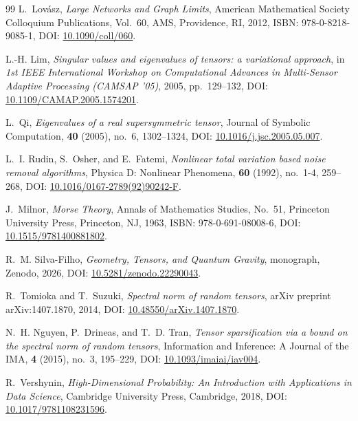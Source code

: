 \documentclass[11pt,a4paper,reqno]{amsart}
\theoremstyle{definition}
\numberwithin{equation}{section}
\begin{document}
\begin{thebibliography}{99}
L.~Lov{\'a}sz,
\emph{Large Networks and Graph Limits},
American Mathematical Society Colloquium Publications, Vol.~60, AMS, Providence, RI, 2012, ISBN: 978-0-8218-9085-1, DOI: \href{https://doi.org/10.1090/coll/060}{10.1090/coll/060}.

L.-H. Lim,
\emph{Singular values and eigenvalues of tensors: a variational approach},
in \emph{1st IEEE International Workshop on Computational Advances in Multi-Sensor Adaptive Processing (CAMSAP '05)}, 2005, pp.~129--132, DOI: \href{https://doi.org/10.1109/CAMAP.2005.1574201}{10.1109/CAMAP.2005.1574201}.

L.~Qi,
\emph{Eigenvalues of a real supersymmetric tensor},
Journal of Symbolic Computation, \textbf{40} (2005), no.~6, 1302--1324, DOI: \href{https://doi.org/10.1016/j.jsc.2005.05.007}{10.1016/j.jsc.2005.05.007}.

L.~I. Rudin, S.~Osher, and E.~Fatemi,
\emph{Nonlinear total variation based noise removal algorithms},
Physica D: Nonlinear Phenomena, \textbf{60} (1992), no.~1-4, 259--268, DOI: \href{https://doi.org/10.1016/0167-2789(92)90242-F}{10.1016/0167-2789(92)90242-F}.

J.~Milnor,
\emph{Morse Theory},
Annals of Mathematics Studies, No.~51, Princeton University Press, Princeton, NJ, 1963, ISBN: 978-0-691-08008-6, DOI: \href{https://doi.org/10.1515/9781400881802}{10.1515/9781400881802}.

R.~M. Silva-Filho,
\emph{Geometry, Tensors, and Quantum Gravity},
monograph, Zenodo, 2026, DOI: \href{https://doi.org/10.5281/zenodo.22290043}{10.5281/zenodo.22290043}.

R.~Tomioka and T.~Suzuki,
\emph{Spectral norm of random tensors},
arXiv preprint arXiv:1407.1870, 2014, DOI: \href{https://doi.org/10.48550/arXiv.1407.1870}{10.48550/arXiv.1407.1870}.

N.~H. Nguyen, P.~Drineas, and T.~D. Tran,
\emph{Tensor sparsification via a bound on the spectral norm of random tensors},
Information and Inference: A Journal of the IMA, \textbf{4} (2015), no.~3, 195--229, DOI: \href{https://doi.org/10.1093/imaiai/iav004}{10.1093/imaiai/iav004}.

R.~Vershynin,
\emph{High-Dimensional Probability: An Introduction with Applications in Data Science},
Cambridge University Press, Cambridge, 2018, DOI: \href{https://doi.org/10.1017/9781108231596}{10.1017/9781108231596}.


\end{thebibliography}
\end{document}
